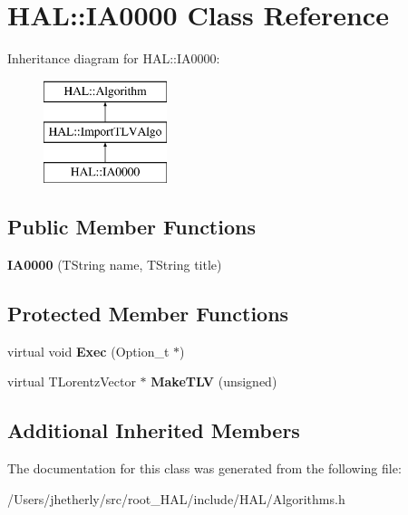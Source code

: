 \hypertarget{class_h_a_l_1_1_i_a0000}{\section{H\-A\-L\-:\-:I\-A0000 Class Reference}
\label{class_h_a_l_1_1_i_a0000}
}
Inheritance diagram for H\-A\-L\-:\-:I\-A0000\-:\begin{figure}[H]
\begin{center}
\leavevmode
\includegraphics[height=3.000000cm]{class_h_a_l_1_1_i_a0000}
\end{center}
\end{figure}
\subsection*{Public Member Functions}
\begin{DoxyCompactItemize}
\item 
\hypertarget{class_h_a_l_1_1_i_a0000_a50a9cf30836e759d26cf2e3cb3084749}{{\bfseries I\-A0000} (T\-String name, T\-String title)}\label{class_h_a_l_1_1_i_a0000_a50a9cf30836e759d26cf2e3cb3084749}

\end{DoxyCompactItemize}
\subsection*{Protected Member Functions}
\begin{DoxyCompactItemize}
\item 
\hypertarget{class_h_a_l_1_1_i_a0000_a1c2bfacb12fd984648c5bf91ca2a4e79}{virtual void {\bfseries Exec} (Option\-\_\-t $\ast$)}\label{class_h_a_l_1_1_i_a0000_a1c2bfacb12fd984648c5bf91ca2a4e79}

\item 
\hypertarget{class_h_a_l_1_1_i_a0000_aacf10223fa251dc1655ac7bafb5599b2}{virtual T\-Lorentz\-Vector $\ast$ {\bfseries Make\-T\-L\-V} (unsigned)}\label{class_h_a_l_1_1_i_a0000_aacf10223fa251dc1655ac7bafb5599b2}

\end{DoxyCompactItemize}
\subsection*{Additional Inherited Members}


The documentation for this class was generated from the following file\-:\begin{DoxyCompactItemize}
\item 
/\-Users/jhetherly/src/root\-\_\-\-H\-A\-L/include/\-H\-A\-L/Algorithms.\-h\end{DoxyCompactItemize}
